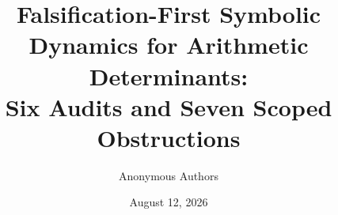 \documentclass[11pt]{article}
\title{\textbf{Falsification-First Symbolic Dynamics for Arithmetic Determinants:}\\
Six Audits and Seven Scoped Obstructions}
\author{Anonymous Authors}
\date{August 12, 2026}
\theoremstyle{definition}
\begin{document}
\maketitle

\begin{abstract}

\end{abstract}










\clearpage



\clearpage
\appendix


\end{document}
